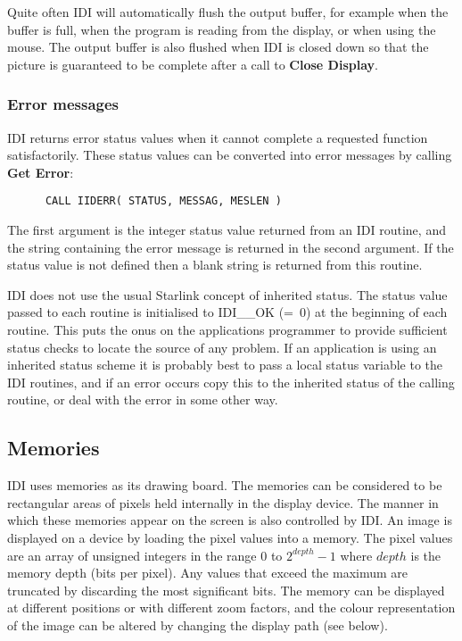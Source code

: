 Quite often IDI will automatically flush the output buffer, for example
when the buffer is full, when the program is reading from the display,
or when using the mouse. The output buffer is also flushed when IDI is closed
down so that the picture is guaranteed to be complete after a call to
{\bf Close Display}.

\subsubsection{Error messages}

IDI returns error status values when it cannot complete a requested
function satisfactorily. These status values can be converted into
error messages by calling {\bf Get Error}:
\begin{small}
\begin{verbatim}
      CALL IIDERR( STATUS, MESSAG, MESLEN )
\end{verbatim}
\end{small}
The first argument is the integer status value returned from an IDI
routine, and the string containing the error message is returned in
the second argument. If the status value is not defined then a blank
string is returned from this routine.

IDI does not use the usual Starlink concept of inherited status. The
status value passed to each routine is initialised to IDI\_\_OK (=~0)
at the beginning of each routine. This puts the onus on the applications
programmer to provide sufficient status checks to locate the source of
any problem. If an application is using an
inherited status scheme it is probably best to pass a local status
variable to the IDI routines, and if an error occurs copy this to the
inherited status of the calling routine, or deal with the error in some
other way.

\subsection{Memories}

IDI uses memories as its drawing board. The memories can be considered to
be rectangular areas of pixels held internally in the display device.
The manner in which these memories appear on the screen is also controlled
by IDI.
An image is displayed on a device by loading the pixel values into a memory.
The pixel values are an array of unsigned integers in the range 0 to
$2^{depth}-1$ where $depth$ is the memory depth (bits per pixel). Any
values that exceed the maximum are truncated by discarding the most
significant bits. The memory can be displayed
at different positions or with different zoom factors, and the colour
representation of the image can be altered by changing the display path
(see below).

